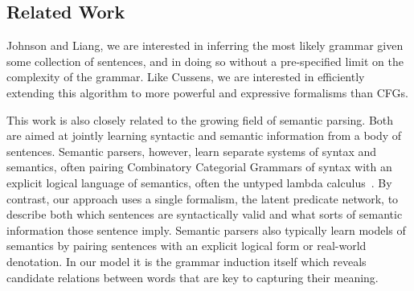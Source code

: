 \documentclass[11pt, twocolumn]{article}
\begin{document}


\subsection{Related Work}
Johnson and Liang, we are interested in inferring the most likely
grammar given some collection of sentences, and in doing so without a
pre-specified limit on the complexity of the grammar. Like Cussens, we
are interested in efficiently extending this algorithm to more
powerful and expressive formalisms than CFGs.

This work is also closely related to the growing field of semantic
parsing. Both are aimed at jointly learning syntactic and semantic
information from a body of sentences. Semantic parsers, however, learn
separate systems of syntax and semantics, often pairing Combinatory
Categorial Grammars of syntax with an explicit logical language of
semantics, often the untyped lambda
calculus~\cite{berant2013semantic,liang2013learning,kwiatkowski2010inducing}. By
contrast, our approach uses a single formalism, the latent predicate
network, to describe both which sentences are syntactically valid and
what sorts of semantic information those sentence imply. Semantic
parsers also typically learn models of semantics by pairing sentences
with an explicit logical form or real-world denotation. In our model
it is the grammar induction itself which reveals candidate relations
between words that are key to capturing their meaning.
\end{document}

